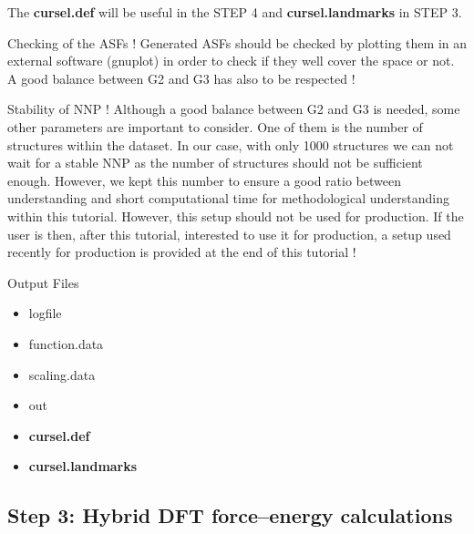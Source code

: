 \documentclass[12pt]{article}
\newcommand\Warning{%
 \makebox[1.4em][c]{%
 \makebox[0pt][c]{\raisebox{.1em}{\small!}}%
 \makebox[0pt][c]{\color{red}\Large$\bigtriangleup$}}}%
\begin{document}
The \textbf{cursel.def} will be useful in the STEP 4 and \textbf{cursel.landmarks} in STEP 3. \\
\begin{mybox1}{Checking of the ASFs !}
\Warning Generated ASFs  should be checked by plotting them in an external software (gnuplot) in order to check if they well cover the space or not. A good balance between G2 and G3 has also to be respected !
\end{mybox1}
\begin{mybox1}{Stability of NNP !}
\Warning Although a good balance between G2 and G3 is needed, some other parameters are important to consider. One of them is the number of structures within the dataset. In our case, with only 1000 structures we can not wait for a stable NNP as the number of structures should not be sufficient enough. However, we kept this number to ensure a good ratio between understanding and short computational time for methodological understanding within this tutorial. However, this setup should not be used for production. If the user is then, after this tutorial, interested to use it for production, a setup used recently for production is provided at the end of this tutorial ! 
\end{mybox1}


\begin{mybox3}{Output Files}
\begin{itemize}
    \item logfile
    \item function.data
    \item scaling.data
    \item out
    \item \textbf{cursel.def}
    \item \textbf{cursel.landmarks}
\end{itemize}
\end{mybox3}
%
\subsection{Step 3: Hybrid DFT force--energy calculations}
\end{document}

